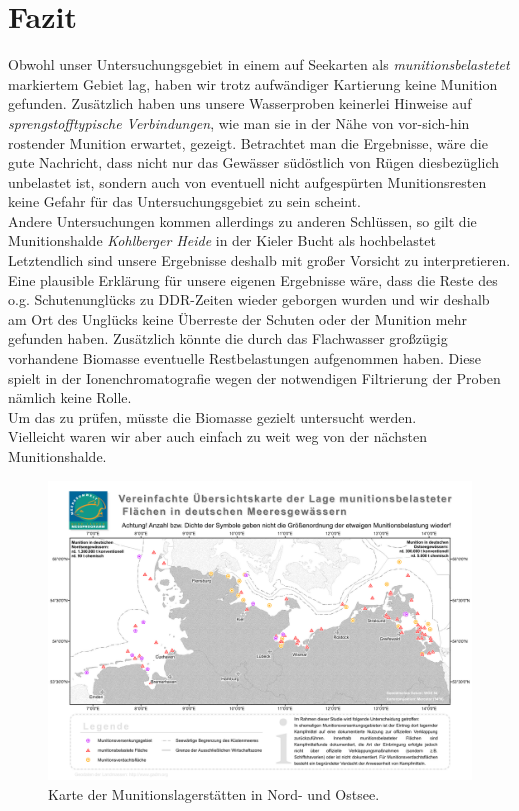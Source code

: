 
\chapter[Fazit]{Fazit}

Obwohl unser Untersuchungsgebiet in einem auf Seekarten als \emph{munitionsbelastetet} markiertem Gebiet lag, haben wir trotz aufwändiger Kartierung keine Munition gefunden. Zusätzlich haben uns unsere Wasserproben keinerlei Hinweise auf \emph{sprengstofftypische Verbindungen}, wie man sie in der Nähe von vor-sich-hin rostender Munition erwartet, gezeigt. Betrachtet man die Ergebnisse, wäre die gute Nachricht, dass nicht nur das Gewässer südöstlich von Rügen diesbezüglich unbelastet ist, sondern auch von eventuell nicht aufgespürten Munitionsresten keine Gefahr für das Untersuchungsgebiet zu sein scheint. \\
Andere Untersuchungen kommen allerdings zu anderen Schlüssen, so gilt die Munitionshalde \emph{Kohlberger Heide} in der Kieler Bucht als hochbelastet\cite{kohl} \\
Letztendlich sind unsere Ergebnisse deshalb mit großer Vorsicht zu interpretieren. \\
Eine plausible Erklärung für unsere eigenen Ergebnisse wäre, dass die Reste des o.g. Schutenunglücks zu DDR-Zeiten wieder geborgen wurden und wir deshalb am Ort des Unglücks keine Überreste der Schuten oder der Munition mehr gefunden haben.
Zusätzlich könnte die durch das Flachwasser großzügig vorhandene Biomasse eventuelle Restbelastungen aufgenommen haben. Diese spielt in der Ionenchromatografie wegen der notwendigen Filtrierung der Proben nämlich keine Rolle. \\
Um das zu prüfen, müsste die Biomasse gezielt untersucht werden.\\
Vielleicht waren wir aber auch einfach zu weit weg von der nächsten Munitionshalde.\\
\begin{figure}[htb!]
\includegraphics[height=\textheight,%
                   width=\textwidth,%
                   keepaspectratio]{Bilder/karte_muni.PDF}
\caption{Karte der Munitionslagerstätten in Nord- und Ostsee\cite{shmuni}.}
\end{figure}

